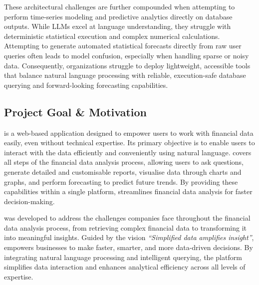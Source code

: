 \noindent These architectural challenges are further compounded when attempting to perform time-series modeling and predictive analytics directly on database outputs. While LLMs excel at language understanding, they struggle with deterministic statistical execution and complex numerical calculations. Attempting to generate automated statistical forecasts directly from raw user queries often leads to model confusion, especially when handling sparse or noisy data. Consequently, organizations struggle to deploy lightweight, accessible tools that balance natural language processing with reliable, execution-safe database querying and forward-looking forecasting capabilities.

\subsection{Project Goal \& Motivation}
\label{sub:goal-motivation}

\noindent \projname{} is a web-based application designed to empower users to work
with financial data easily, even without technical expertise. Its
primary objective is to enable users to interact with the data
efficiently and conveniently using natural language. \projname{} covers
all steps of the financial data analysis process, allowing users to ask
questions, generate detailed and customisable reports, visualise data
through charts and graphs, and perform forecasting to predict future
trends. By providing these capabilities within a single platform,
\projname{} streamlines financial data analysis for faster
decision-making.

\noindent \projname{} was developed to address the challenges companies face
throughout the financial data analysis process, from retrieving complex
financial data to transforming it into meaningful insights. Guided by
the vision \emph{``Simplified data amplifies insight''}, \projname{}
empowers businesses to make faster, smarter, and more data-driven
decisions. By integrating natural language processing and intelligent
querying, the platform simplifies data interaction and enhances
analytical efficiency across all levels of expertise.